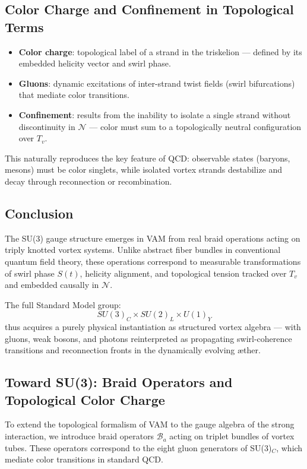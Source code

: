 \subsection*{Color Charge and Confinement in Topological Terms}

\begin{itemize}
    \item \textbf{Color charge}: topological label of a strand in the triskelion — defined by its embedded helicity vector and swirl phase.
    \item \textbf{Gluons}: dynamic excitations of inter-strand twist fields (swirl bifurcations) that mediate color transitions.
    \item \textbf{Confinement}: results from the inability to isolate a single strand without discontinuity in $\mathcal{N}$ — color must sum to a topologically neutral configuration over $T_v$.
\end{itemize}

This naturally reproduces the key feature of QCD: observable states (baryons, mesons) must be color singlets, while isolated vortex strands destabilize and decay through reconnection or recombination.

\subsection*{Conclusion}

The SU(3) gauge structure emerges in VAM from real braid operations acting on triply knotted vortex systems. Unlike abstract fiber bundles in conventional quantum field theory, these operations correspond to measurable transformations of swirl phase \( S(t) \), helicity alignment, and topological tension tracked over \( T_v \) and embedded causally in \( \mathcal{N} \).

The full Standard Model group:
\[
SU(3)_C \times SU(2)_L \times U(1)_Y
\]
thus acquires a purely physical instantiation as structured vortex algebra — with gluons, weak bosons, and photons reinterpreted as propagating swirl-coherence transitions and reconnection fronts in the dynamically evolving æther.

\subsection{Toward SU(3): Braid Operators and Topological Color Charge}

To extend the topological formalism of VAM to the gauge algebra of the strong interaction, we introduce braid operators \( \mathcal{B}_a \) acting on triplet bundles of vortex tubes. These operators correspond to the eight gluon generators of SU(3)\(_C\), which mediate color transitions in standard QCD.

